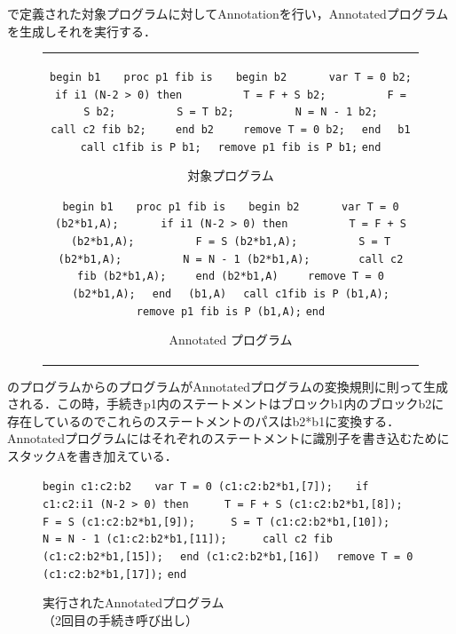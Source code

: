 \documentclass[submit,PRO]{ipsj}
\def\|{\verb|}
\begin{document}
で定義された対象プログラムに対してAnnotationを行い，Annotatedプログラムを生成しそれを実行する．

\begin{figure}[tb]
\begin{center}
\begin{tabular}{c}
\begin{minipage}[t]{0.5\columnwidth}
\footnotesize
\setbox0\vbox{
\hbox{\|begin b1|}
\hbox{\|   proc p1 fib is|}
\hbox{\|   begin b2|}
\hbox{\|      var T = 0 b2;|}
\hbox{\|      if i1 (N-2 > 0) then|}
\hbox{\|         T = F + S b2;|}
\hbox{\|         F = S b2;|}
\hbox{\|         S = T b2;|}
\hbox{\|         N = N - 1 b2;|}
\hbox{\|       call c2 fib b2;|}
\hbox{\|    end b2|}
\hbox{\|    remove T = 0 b2;|}
\hbox{\|  end|}
\hbox{\|  b1|}
\hbox{\|  call c1fib is P b1;|}
\hbox{\|  remove p1 fib is P b1;|}
\hbox{\|end|}
}
\centerline{\fbox{\box0}}
\caption{対象プログラム}
\ecaption{Original Program}
\label{fig:Horiginal}
\end{minipage}

\begin{minipage}[t]{0.5\columnwidth}
\footnotesize
\setbox0\vbox{
\hbox{\|begin b1|}
\hbox{\|   proc p1 fib is|}
\hbox{\|   begin b2|}
\hbox{\|      var T = 0 (b2*b1,A);|}
\hbox{\|      if i1 (N-2 > 0) then|}
\hbox{\|         T = F + S (b2*b1,A);|}
\hbox{\|         F = S (b2*b1,A);|}
\hbox{\|         S = T (b2*b1,A);|}
\hbox{\|         N = N - 1 (b2*b1,A);|}
\hbox{\|       call c2 fib (b2*b1,A);|}
\hbox{\|    end (b2*b1,A)|}
\hbox{\|    remove T = 0 (b2*b1,A);|}
\hbox{\|  end|}
\hbox{\|  (b1,A)|}
\hbox{\|  call c1fib is P (b1,A);|}
\hbox{\|  remove p1 fib is P (b1,A);|}
\hbox{\|end|}
}
\centerline{\fbox{\box0}}
\caption{Annotated プログラム}
\ecaption{Annotated Program}
\label{fig:Hannotated}
\end{minipage}
\end{tabular}
\end{center}
\end{figure}

のプログラムからのプログラムがAnnotatedプログラムの変換規則に則って生成される．この時，手続きp1内のステートメントはブロックb1内のブロックb2に存在しているのでこれらのステートメントのパスはb2*b1に変換する．Annotatedプログラムにはそれぞれのステートメントに識別子を書き込むためにスタックAを書き加えている．


\begin{figure}[tb]
\vbox{
\hbox{\|begin c1:c2:b2|}
\hbox{\|   var T = 0 (c1:c2:b2*b1,[7]);|}
\hbox{\|   if c1:c2:i1 (N-2 > 0) then|}
\hbox{\|     T = F + S (c1:c2:b2*b1,[8]);|}
\hbox{\|     F = S (c1:c2:b2*b1,[9]);|}
\hbox{\|     S = T (c1:c2:b2*b1,[10]);|}
\hbox{\|     N = N - 1 (c1:c2:b2*b1,[11]);|}
\hbox{\|     call c2 fib (c1:c2:b2*b1,[15]);|}
\hbox{\|  end (c1:c2:b2*b1,[16])|}
\hbox{\|  remove T = 0 (c1:c2:b2*b1,[17]);|}
\hbox{\|end|}
}
\centerline{}
\caption{実行されたAnnotatedプログラム\\
（2回目の手続き呼び出し）}
\label{fig:Hexec}
\end{figure}
\end{document}
